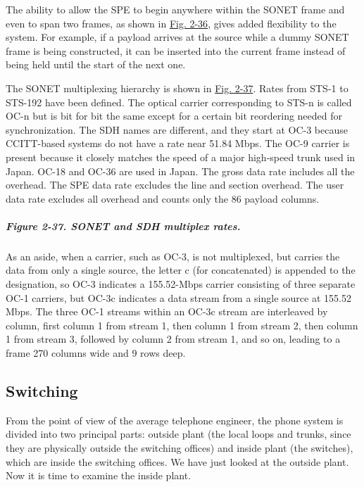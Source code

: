 \documentclass[b5paper,11pt]{memoir}
\begin{document}
The ability to allow the SPE to begin anywhere within the SONET frame
and even to span two frames, as shown in
\protect\hyperlink{0130661023_ch02lev1sec5.htmlux5cux23ch02fig36}{Fig.
2-36}, gives added flexibility to the system. For example, if a payload
arrives at the source while a dummy SONET frame is being constructed, it
can be inserted into the current frame instead of being held until the
start of the next one.

The SONET multiplexing hierarchy is shown in
\protect\hyperlink{0130661023_ch02lev1sec5.htmlux5cux23ch02fig37}{Fig.
2-37}. Rates from STS-1 to STS-192 have been defined. The optical
carrier corresponding to STS-{n} is called OC-{n} but is bit for bit the
same except for a certain bit reordering needed for synchronization. The
SDH names are different, and they start at OC-3 because CCITT-based
systems do not have a rate near 51.84 Mbps. The OC-9 carrier is present
because it closely matches the speed of a major high-speed trunk used in
Japan. OC-18 and OC-36 are used in Japan. The gross data rate includes
all the overhead. The SPE data rate excludes the line and section
overhead. The user data rate excludes all overhead and counts only the
86 payload columns.

\subparagraph[Figure 2-37. SONET and SDH multiplex
rates.]{\texorpdfstring{\protect\hypertarget{0130661023_ch02lev1sec5.htmlux5cux23ch02fig37}{}{}Figure
2-37. SONET and SDH multiplex
rates.}{Figure 2-37. SONET and SDH multiplex rates.}}


As an aside, when a carrier, such as OC-3, is not multiplexed, but
carries the data from only a single source, the letter {c} (for
concatenated) is appended to the designation, so OC-3 indicates a
155.52-Mbps carrier consisting of three separate OC-1 carriers, but
OC-3c indicates a data stream from a single source at 155.52 Mbps. The
three OC-1 streams within an OC-3c stream are interleaved by column,
first column 1 from stream 1, then column 1 from stream 2, then column 1
from stream 3, followed by column 2 from stream 1, and so on, leading to
a frame 270 columns wide and 9 rows deep.

\protect\hypertarget{0130661023_ch02lev1sec5.htmlux5cux23ch02lev2sec21}{}{}

\subsection{Switching}

From the point of view of the average telephone engineer, the phone
system is divided into two principal parts: outside plant (the local
loops and trunks, since they are physically outside the switching
offices) and inside plant (the switches), which are inside the switching
offices. We have just looked at the outside plant. Now it is time to
examine the inside plant.
\end{document}
